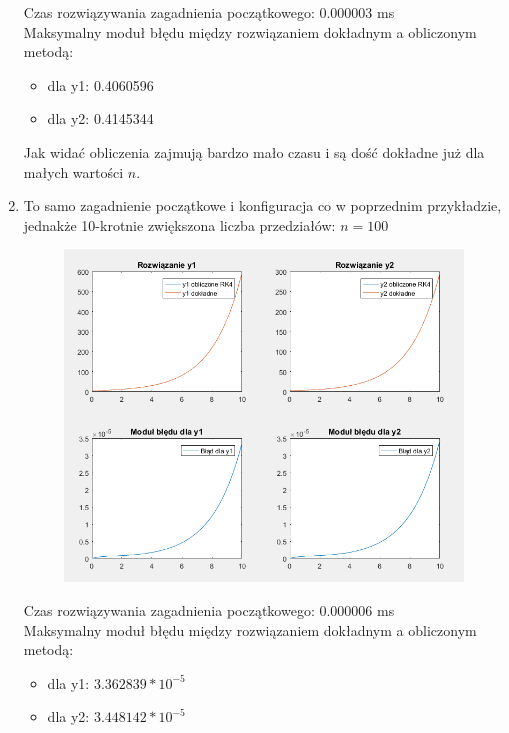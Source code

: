\documentclass[12pt]{article}
\begin{document}
\begin{enumerate}[label=\textbf{Przykład \arabic*}]
	
		Czas rozwiązywania zagadnienia początkowego: 0.000003 ms\\
		Maksymalny moduł błędu między rozwiązaniem dokładnym a obliczonym metodą:
		\begin{itemize}
			\item dla y1: 0.4060596
			\item dla y2: 0.4145344
		\end{itemize}
	
		Jak widać obliczenia zajmują bardzo mało czasu i są dość dokładne już dla małych wartości $n$.
		
		\item 
		\label{example-changingN-2}
		To samo zagadnienie początkowe i konfiguracja co w poprzednim przykładzie, jednakże	10-krotnie zwiększona liczba przedziałów: $n = 100$
		
		\begin{figure}[H]
			\centering
			\includegraphics[scale=0.7]{images/example-2.png}
		\end{figure}
		
		
		Czas rozwiązywania zagadnienia początkowego: 0.000006 ms\\
		Maksymalny moduł błędu między rozwiązaniem dokładnym a obliczonym metodą:
		\begin{itemize}
			\item dla y1: $3.362839 * 10^{-5}$
			\item dla y2: $3.448142 * 10^{-5}$
		\end{itemize}
	

\end{enumerate}
\end{document}

